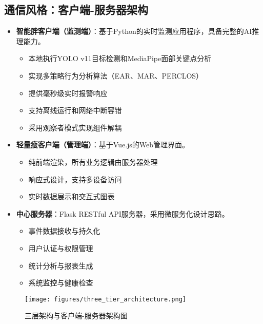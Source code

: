 \documentclass[a4paper,12pt]{article}
\begin{document}
\subsection{通信风格：客户端-服务器架构}
\begin{itemize}
  \item \textbf{智能胖客户端（监测端）}：基于Python的实时监测应用程序，具备完整的AI推理能力。
    \begin{itemize}
      \item 本地执行YOLO v11目标检测和MediaPipe面部关键点分析
      \item 实现多策略行为分析算法（EAR、MAR、PERCLOS）
      \item 提供毫秒级实时报警响应
      \item 支持离线运行和网络中断容错
      \item 采用观察者模式实现组件解耦
    \end{itemize}
  \item \textbf{轻量瘦客户端（管理端）}：基于Vue.js的Web管理界面。
    \begin{itemize}
      \item 纯前端渲染，所有业务逻辑由服务器处理
      \item 响应式设计，支持多设备访问
      \item 实时数据展示和交互式图表
    \end{itemize}
  \item \textbf{中心服务器}：Flask RESTful API服务器，采用微服务化设计思路。
    \begin{itemize}
      \item 事件数据接收与持久化
      \item 用户认证与权限管理
      \item 统计分析与报表生成
      \item 系统监控与健康检查
    \end{itemize}
\end{itemize}

\begin{figure}[h]
  \centering
  \texttt{[image: figures/three\_tier\_architecture.png]}
  \caption{三层架构与客户端-服务器架构图}
  \label{fig:three_tier}
\end{figure}
\end{document}
